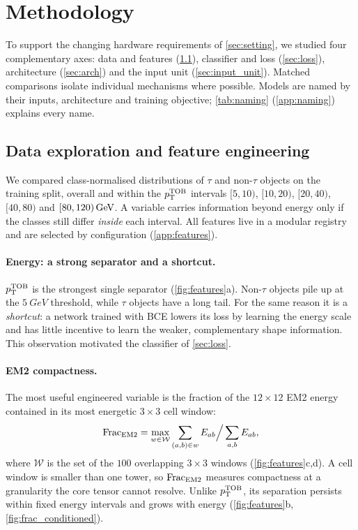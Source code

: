 \section{Methodology}
\label{sec:method}
To support the changing hardware requirements of \cref{sec:setting}, we studied four complementary axes: data and features (\cref{sec:features}), classifier and loss (\cref{sec:loss}), architecture (\cref{sec:arch}) and the input unit (\cref{sec:input_unit}). Matched comparisons isolate individual mechanisms where possible. Models are named by their inputs, architecture and training objective; \cref{tab:naming} (\cref{app:naming}) explains every name.

\subsection{Data exploration and feature engineering}
\label{sec:features}
We compared class-normalised distributions of $\tau$ and non-$\tau$ objects on the training split, overall and within the $p_{\mathrm{T}}^{\mathrm{TOB}}$ intervals $[5,10)$, $[10,20)$, $[20,40)$, $[40,80)$ and $[80,120)\,\mathrm{GeV}$. A variable carries information beyond energy only if the classes still differ \emph{inside} each interval. All features live in a modular registry and are selected by configuration (\cref{app:features}).

\paragraph{Energy: a strong separator and a shortcut.}
$p_{\mathrm{T}}^{\mathrm{TOB}}$ is the strongest single separator (\cref{fig:features}a). Non-$\tau$ objects pile up at the $\SI{5}{GeV}$ threshold, while $\tau$ objects have a long tail. For the same reason it is a \emph{shortcut}: a network trained with BCE lowers its loss by learning the energy scale and has little incentive to learn the weaker, complementary shape information. This observation motivated the classifier of \cref{sec:loss}.

\paragraph{EM2 compactness.}
The most useful engineered variable is the fraction of the $12\times12$ EM2 energy contained in its most energetic $3\times3$ cell window:
\begin{equation}
  \mathrm{Frac}_{\mathrm{EM2}}=\max_{w\in\mathcal{W}}\sum_{(a,b)\in w}E_{ab}\Big/\sum_{a,b}E_{ab},
  \label{eq:frac}
\end{equation}
where $\mathcal{W}$ is the set of the $100$ overlapping $3\times3$ windows (\cref{fig:features}c,d). A cell window is smaller than one tower, so $\mathrm{Frac}_{\mathrm{EM2}}$ measures compactness at a granularity the core tensor cannot resolve. Unlike $p_{\mathrm{T}}^{\mathrm{TOB}}$, its separation persists within fixed energy intervals and grows with energy (\cref{fig:features}b, \cref{fig:frac_conditioned}).

